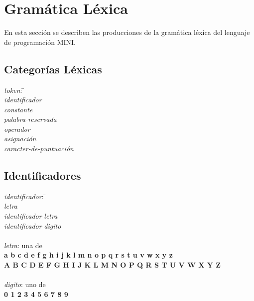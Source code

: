 
\section{Gramática Léxica}

En esta sección se describen las producciones de la gramática léxica del lenguaje de programación MINI.

\subsection{Categorías Léxicas}

\begin{tabbing}

\textit{token}: \= \+ \\
    \textit{identificador} \\
    \textit{constante}\\
    \textit{palabra-reservada} \\
    \textit{operador} \\
    \textit{asignación} \\
    \textit{caracter-de-puntuación}

\end{tabbing}

\subsection{Identificadores}

\begin{tabbing}

\textit{identificador}: \= \+ \\
    \textit{letra} \\
    \textit{identificador} \textit{letra} \\
    \textit{identificador} \textit{digito} \\

\- \\
\textit{letra}: una de \+ \\
    \textbf{a b c d e f g h i j k l m n o p q r s t u v w x y z}\\
    \textbf{A B C D E F G H I J K L M N O P Q R S T U V W X Y Z} \\

\- \\
\textit{digito}: uno de \+ \\
    \textbf{0 1 2 3 4 5 6 7 8 9}

\end{tabbing}

